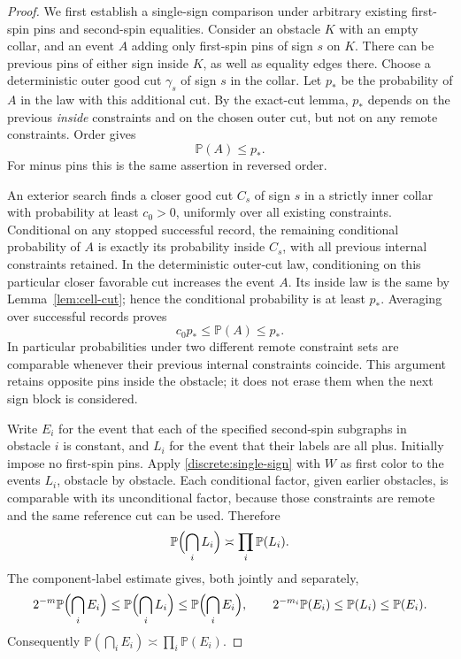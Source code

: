 \documentclass[11pt]{article}
\newcommand{\Prob}{\mathbb P}
\theoremstyle{definition}
\theoremstyle{remark}
\numberwithin{equation}{section}
\begin{document}
\begin{proof}
We first establish a single-sign comparison under arbitrary existing
first-spin pins and second-spin equalities. Consider an obstacle $K$
with an empty collar, and an event $A$ adding only first-spin pins of
sign $s$ on $K$. There can be previous pins of either sign inside $K$,
as well as equality edges there. Choose a deterministic outer good cut
$\gamma_s$ of sign $s$ in the collar. Let $p_*$ be the probability of
$A$ in the law with this additional cut. By the exact-cut lemma, $p_*$
depends on the previous \emph{inside} constraints and on the chosen
outer cut, but not on any remote constraints. Order gives
\begin{equation}\label{discrete:pstar}
 \Prob(A)\le p_*.
\end{equation}
For minus pins this is the same assertion in reversed order.

An exterior search finds a closer good cut $C_s$ of sign $s$ in a
strictly inner collar with probability at least $c_0>0$, uniformly over
all existing constraints. Conditional on any stopped successful record,
the remaining conditional probability of $A$ is exactly its probability
inside $C_s$, with all previous internal constraints retained. In the
deterministic outer-cut law, conditioning on this particular closer
favorable cut increases the event $A$. Its inside law is the same by
Lemma~\ref{lem:cell-cut}; hence the conditional probability is at least
$p_*$. Averaging over successful records proves
\begin{equation}\label{discrete:single-sign}
 c_0p_*\le\Prob(A)\le p_*.
\end{equation}
In particular probabilities under two different remote constraint sets
are comparable whenever their previous internal constraints coincide.
This argument retains opposite pins inside the obstacle; it does not
erase them when the next sign block is considered.

Write $E_i$ for the event that each of the specified second-spin
subgraphs in obstacle $i$ is constant, and $L_i$ for the event that their
labels are all plus. Initially impose no first-spin pins. Apply
\eqref{discrete:single-sign} with $W$ as first color to the events $L_i$,
obstacle by obstacle. Each conditional factor, given earlier obstacles,
is comparable with its unconditional factor, because those constraints
are remote and the same reference cut can be used. Therefore
\[
 \Prob\Bigl(\bigcap_i L_i\Bigr)\asymp\prod_i\Prob(L_i).
\]
The component-label estimate gives, both jointly and separately,
\[
 2^{-m}\Prob\Bigl(\bigcap_i E_i\Bigr)
 \le\Prob\Bigl(\bigcap_i L_i\Bigr)
 \le\Prob\Bigl(\bigcap_i E_i\Bigr),\qquad
 2^{-m_i}\Prob(E_i)\le\Prob(L_i)\le\Prob(E_i).
\]
Consequently $\Prob(\bigcap_iE_i)\asymp\prod_i\Prob(E_i)$.


\end{proof}
\end{document}
